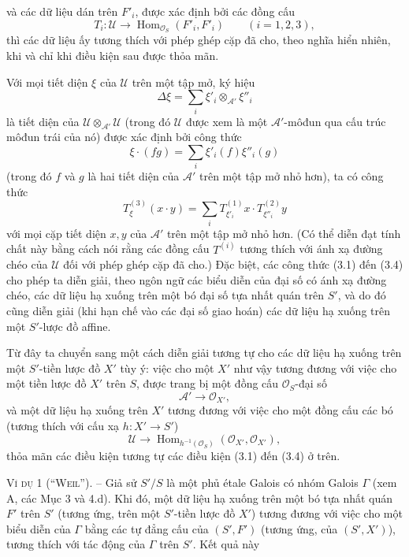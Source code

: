 \documentclass[11pt,twoside,openany]{book}
\numberwithin{equation}{section}
\newcommand{\src}[1]{%
  \phantomsection\hypertarget{src:\fgasourceid:#1}{}%
  \marginpar{\raggedleft\footnotesize\sffamily #1}%
}
\newcommand{\fgasourceid}{unset}
\begin{document}
\src{320}
và các dữ liệu dán trên $F'_i$, được xác định bởi các đồng cấu
\[
  T_i:\mathcal U\longrightarrow
  \operatorname{Hom}_{\mathcal O_S}(F'_i,F'_i)
  \qquad (i=1,2,3),
\]
thì các dữ liệu ấy tương thích với phép ghép cặp đã cho, theo nghĩa hiển nhiên,
khi và chỉ khi điều kiện sau được thỏa mãn.

Với mọi tiết diện $\xi$ của $\mathcal U$ trên một tập mở, ký hiệu
\[
  \Delta\xi=\sum_i\xi'_i\otimes_{\mathcal A'}\xi''_i
\]
là tiết diện của $\mathcal U\otimes_{\mathcal A'}\mathcal U$ (trong đó
$\mathcal U$ được xem là một $\mathcal A'$-môđun qua cấu trúc môđun trái của
nó) được xác định bởi công thức
\[
  \xi\mathbin{\cdot}(fg)=\sum_i\xi'_i(f)\xi''_i(g)
\]
(trong đó $f$ và $g$ là hai tiết diện của $\mathcal A'$ trên một tập mở nhỏ
hơn), ta có công thức
\begin{equation}
  T^{(3)}_\xi(x\mathbin{\cdot}y)
  =\sum_iT^{(1)}_{\xi'_i}x\mathbin{\cdot}T^{(2)}_{\xi''_i}y
  \tag{3.4}
\end{equation}
với mọi cặp tiết diện $x,y$ của $\mathcal A'$ trên một tập mở nhỏ hơn. (Có
thể diễn đạt tính chất này bằng cách nói
rằng các đồng cấu $T^{(i)}$ tương thích với ánh xạ đường chéo của $\mathcal U$
đối với phép ghép cặp đã cho.) Đặc biệt, các công thức (3.1) đến (3.4) cho phép
ta diễn giải, theo ngôn ngữ các biểu diễn của đại số có ánh xạ đường chéo, các
dữ liệu hạ xuống trên một bó đại số tựa nhất quán trên $S'$, và do đó cũng diễn
giải (khi hạn chế vào các đại số giao hoán) các dữ liệu hạ xuống trên một
$S'$-lược đồ affine.

Từ đây ta chuyển sang một cách diễn giải tương tự cho các dữ liệu hạ xuống trên
một $S'$-tiền lược đồ $X'$ tùy ý: việc cho một $X'$ như vậy tương đương với
việc cho một tiền lược đồ $X'$ trên $S$, được trang bị một đồng cấu
$\mathcal O_S$-đại số
\[
  \mathcal A'\longrightarrow\mathcal O_{X'},
\]
và một dữ liệu hạ xuống trên $X'$ tương đương với việc cho một đồng cấu các bó
(tương thích với cấu xạ $h:X'\longrightarrow S'$)
\[
  \mathcal U\longrightarrow
  \operatorname{Hom}_{h^{-1}(\mathcal O_S)}
  (\mathcal O_{X'},\mathcal O_{X'}),
\]
thỏa mãn các điều kiện tương tự các điều kiện (3.1) đến (3.4) ở trên.

\textsc{Ví dụ 1 (``Weil'').} -- Giả sử $S'/S$ là một phủ étale Galois có nhóm
Galois $\Gamma$ (xem A, các Mục 3 và 4.d). Khi đó, một dữ liệu hạ xuống trên một
bó tựa nhất quán $F'$ trên $S'$ (tương ứng, trên một $S'$-tiền lược đồ $X'$)
tương đương với việc cho một biểu diễn của $\Gamma$ bằng các tự đẳng cấu của
$(S',F')$ (tương ứng, của $(S',X')$), tương thích với tác động của $\Gamma$
trên $S'$. Kết quả này
\end{document}
